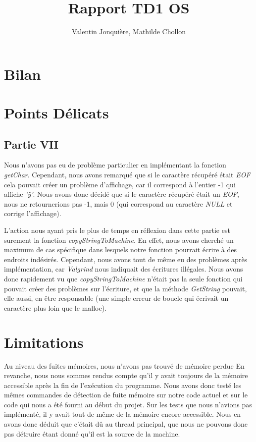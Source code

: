 \documentclass{article}
\author{
    Valentin Jonquière,
    Mathilde Chollon
}
\title{Rapport TD1 OS}
\begin{document}
\maketitle

\pagebreak

\tableofcontents

\pagebreak

\section{Bilan}


\section{Points Délicats}

\subsection{Partie VII} \label{bugPartieVII}
Nous n'avons pas eu de problème particulier en implémentant la fonction \textit{getChar}. Cependant, nous avons remarqué que si le caractère récupéré
était \textit{EOF} cela pouvait créer un problème d'affichage, car il correspond à l'entier -1 qui affiche \textit{'ÿ'}. Nous avons donc décidé que si
le caractère récupéré était un \textit{EOF}, nous ne retournerions pas -1, mais 0 (qui correspond au caractère \textit{NULL} et corrige l'affichage).

L'action nous ayant pris le plus de temps en réflexion dans cette partie est surement la fonction \textit{copyStringToMachine}.
En effet, nous avons cherché un maximum de cas spécifique dans lesquels notre fonction pourrait écrire à des endroits
indésirés. Cependant, nous avons tout de même eu des problèmes après implémentation, car \textit{Valgrind} nous indiquait des écritures
illégales. Nous avons donc rapidement vu que \textit{copyStringToMachine} n'était pas la seule fonction qui pouvait créer des problèmes
sur l'écriture, et que la méthode \textit{GetString} pouvait, elle aussi, en être responsable (une simple erreur de boucle qui écrivait un caractère plus loin que le malloc).


\section{Limitations}
Au niveau des fuites mémoires, nous n'avons pas trouvé de mémoire perdue En revanche, nous nous sommes rendus compte qu'il y avait toujours de la mémoire accessible après la fin de l'exécution du programme.
Nous avons donc testé les mêmes commandes de détection de fuite mémoire sur notre code actuel et sur le code qui nous a été fourni au début du projet. Sur les tests que nous n'avions pas implémenté, il y avait tout de même
de la mémoire encore accessible. Nous en avons donc déduit que c'était dû au thread principal, que nous ne pouvons donc pas détruire étant donné qu'il est la source de la machine.
\end{document}
